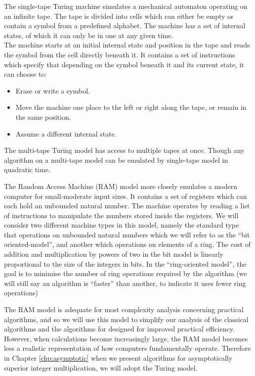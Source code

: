 The single-tape Turing machine simulates a mechanical automaton operating on an infinite tape. The tape is divided into cells which can either be empty or contain a symbol from a predefined alphabet. The machine has a set of internal states, of which it can only be in one at any given time.\\
The machine starts at an initial internal state and position in the tape and reads the symbol from the cell directly beneath it. It contains a set of instructions which specify that depending on the symbol beneath it and its current state, it can choose to:
\begin{itemize}
    \item Erase or write a symbol.
    \item Move the machine one place to the left or right along the tape, or remain in the same position.
    \item Assume a different internal state.
\end{itemize}
The multi-tape Turing model has access to multiple tapes at once. Though any algorithm on a multi-tape model can be emulated by single-tape model in quadratic time\cite{comp-complexity}.

The Random Access Machine (RAM) model more closely emulates a modern computer for small-moderate input sizes. It contains a set of registers which can each hold an unbounded natural number. The machine operates by reading a list of instructions to manipulate the numbers stored inside the registers. We will consider two different machine types in this model, namely the standard type that operations on unbounded natural numbers which we will refer to as the ``bit oriented-model'', and another which operations on elements of a ring. The cost of addition and multiplication by powers of two in the bit model is linearly proportional to the size of the integers in bits. In the ``ring-oriented model'',  the goal is to minimise the number of ring operations required by the algorithm (we will still say an algorithm is ``faster'' than another, to indicate it uses fewer ring operations)

The RAM model is adequate for most complexity analysis concerning practical algorithms, and so we will use this model to simplify our analysis of the classical algorithms and the algorithms for designed for improved practical efficiency. However, when calculations become increasingly large, the RAM model becomes less a realistic representation of how computers fundamentally operate. Therefore in Chapter \ref{chp:asymptotic} when we present algorithms for asymptotically superior integer multiplication, we will adopt the Turing model.

